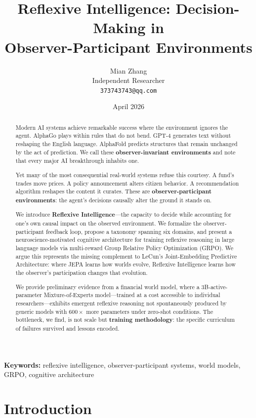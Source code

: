 \documentclass[11pt,a4paper]{article}
\title{\textbf{Reflexive Intelligence: Decision-Making in\\Observer-Participant Environments}}
\author{
  Mian Zhang\\
  Independent Researcher\\
  \texttt{373743743@qq.com}
}
\date{April 2026}
\begin{document}
\maketitle

\begin{abstract}
Modern AI systems achieve remarkable success where the environment ignores the agent. AlphaGo plays within rules that do not bend. GPT-4 generates text without reshaping the English language. AlphaFold predicts structures that remain unchanged by the act of prediction. We call these \textbf{observer-invariant environments} and note that every major AI breakthrough inhabits one.

Yet many of the most consequential real-world systems refuse this courtesy. A fund's trades move prices. A policy announcement alters citizen behavior. A recommendation algorithm reshapes the content it curates. These are \textbf{observer-participant environments}: the agent's decisions causally alter the ground it stands on.

We introduce \textbf{Reflexive Intelligence}---the capacity to decide while accounting for one's own causal impact on the observed environment. We formalize the observer-participant feedback loop, propose a taxonomy spanning six domains, and present a neuroscience-motivated cognitive architecture for training reflexive reasoning in large language models via multi-reward Group Relative Policy Optimization (GRPO). We argue this represents the missing complement to LeCun's Joint-Embedding Predictive Architecture: where JEPA learns how worlds evolve, Reflexive Intelligence learns how the observer's participation changes that evolution.

We provide preliminary evidence from a financial world model, where a 3B-active-parameter Mixture-of-Experts model---trained at a cost accessible to individual researchers---exhibits emergent reflexive reasoning not spontaneously produced by generic models with $600\times$ more parameters under zero-shot conditions. The bottleneck, we find, is not scale but \textbf{training methodology}: the specific curriculum of failures survived and lessons encoded.
\end{abstract}

\noindent\textbf{Keywords:} reflexive intelligence, observer-participant systems, world models, GRPO, cognitive architecture

\section{Introduction}
\end{document}
